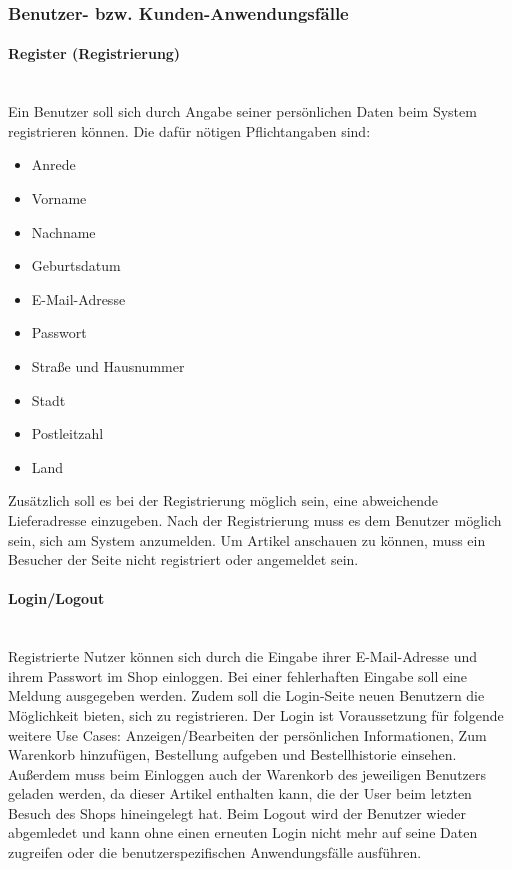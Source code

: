 \subsubsection{Benutzer- bzw. Kunden-Anwendungsfälle}
\paragraph{Register (Registrierung)}$\;$ \\
Ein Benutzer soll sich durch Angabe seiner persönlichen Daten beim System registrieren können.
Die dafür nötigen Pflichtangaben sind:
\begin{itemize}
\item Anrede
\item Vorname
\item Nachname
\item Geburtsdatum
\item E-Mail-Adresse
\item Passwort
\item Straße und Hausnummer
\item Stadt
\item Postleitzahl
\item Land
\end{itemize}
Zusätzlich soll es bei der Registrierung möglich sein, eine abweichende Lieferadresse einzugeben.
Nach der Registrierung muss es dem Benutzer möglich sein, sich am System anzumelden.
Um Artikel anschauen zu können, muss ein Besucher der Seite nicht registriert oder angemeldet sein.

\paragraph{Login/Logout}$\;$ \\
Registrierte Nutzer können sich durch die Eingabe ihrer E-Mail-Adresse und ihrem Passwort im Shop einloggen.
Bei einer fehlerhaften Eingabe soll eine Meldung ausgegeben werden.
Zudem soll die Login-Seite neuen Benutzern die Möglichkeit bieten, sich zu registrieren.
Der Login ist Voraussetzung für folgende weitere Use Cases: Anzeigen/Bearbeiten der persönlichen Informationen, Zum Warenkorb hinzufügen, Bestellung aufgeben und Bestellhistorie einsehen.
Außerdem muss beim Einloggen auch der Warenkorb des jeweiligen Benutzers geladen werden, da dieser Artikel enthalten kann, die der User beim letzten Besuch des Shops hineingelegt hat.
Beim Logout wird der Benutzer wieder abgemledet und kann ohne einen erneuten Login nicht mehr auf seine Daten zugreifen oder die benutzerspezifischen Anwendungsfälle ausführen.

